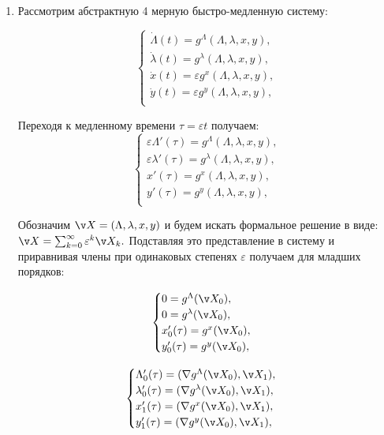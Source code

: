 \begin{enumerate}

\item Рассмотрим абстрактную 4 мерную быстро-медленную систему:

\begin{equation*}
    \begin{cases}
        \dot \Lambda(t)=g^\Lambda(\Lambda,\lambda,x,y), \\
        \dot \lambda(t)=g^\lambda(\Lambda,\lambda,x,y), \\
        \dot x(t)=\varepsilon g^x(\Lambda,\lambda,x,y), \\
        \dot y(t)=\varepsilon g^y(\Lambda,\lambda,x,y), \\
    \end{cases}
\end{equation*}

Переходя к медленному времени $\tau = \varepsilon t$ получаем:
\begin{equation*}
    \begin{cases}
        \varepsilon \Lambda'(\tau)=g^\Lambda(\Lambda,\lambda,x,y), \\
        \varepsilon \lambda'(\tau)=g^\lambda(\Lambda,\lambda,x,y), \\
        x'(\tau)=g^x(\Lambda,\lambda,x,y), \\
        y'(\tau)=g^y(\Lambda,\lambda,x,y), \\
    \end{cases}
\end{equation*}

Обозначим $\v X = (\Lambda,\lambda,x,y)$ и будем искать формальное решение в виде:
$\v X = \sum_{k=0}^\infty \varepsilon^k \v X_k.$
Подставляя это представление в систему и приравнивая члены при одинаковых степенях $\varepsilon$ получаем для младших порядков:

\begin{equation}
    \begin{cases}
        0=g^\Lambda(\v X_0), \\
        0=g^\lambda(\v X_0), \\
        x_0'(\tau)=g^x(\v X_0), \\
        y_0'(\tau)=g^y(\v X_0), \\
    \end{cases}
    \label{slow_sys}
\end{equation}

\begin{equation}
    \begin{cases}
        \Lambda_0'(\tau)=(\nabla g^\Lambda(\v X_0),\v X_1), \\
        \lambda_0'(\tau)=(\nabla g^\lambda(\v X_0),\v X_1), \\
        x_1'(\tau)=(\nabla g^x(\v X_0),\v X_1), \\
        y_1'(\tau)=(\nabla g^y(\v X_0),\v X_1), \\
    \end{cases}
    \label{1st_order}
\end{equation}


\end{enumerate}
